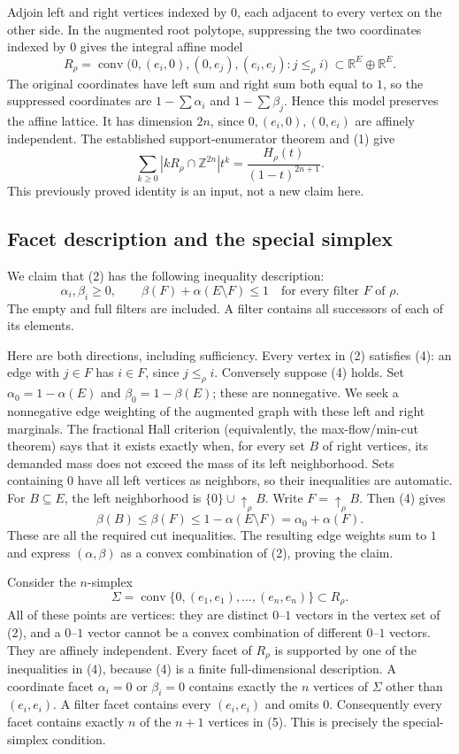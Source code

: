 \documentclass[11pt]{article}
\newcommand{\conv}{\operatorname{conv}}
\begin{document}
Adjoin left and right vertices indexed by $0$, each adjacent to every
vertex on the other side. In the augmented root polytope, suppressing
the two coordinates indexed by $0$ gives the integral affine model
\[
 R_\rho=\conv\bigl(0,(e_i,0),(0,e_j),(e_i,e_j):j\le_\rho i\bigr)
                  \ \subset\mathbb R^{E}\oplus\mathbb R^{E}.       \tag{2}
\]
The original coordinates have left sum and right sum both equal to
$1$, so the suppressed coordinates are $1-\sum\alpha_i$ and
$1-\sum\beta_j$. Hence this model preserves the affine lattice.
It has dimension $2n$, since $0,(e_i,0),(0,e_i)$ are affinely independent.
The established support-enumerator theorem \cite[Theorem 1.2]{D}
and (1) give
\[
 \sum_{k\ge0}|kR_\rho\cap\mathbb Z^{2n}|t^k
       =\frac{H_\rho(t)}{(1-t)^{2n+1}}.                             \tag{3}
\]
This previously proved identity is an input, not a new claim here.

\subsection*{Facet description and the special simplex}
We claim that (2) has the following inequality description:
\[
 \alpha_i,\beta_i\ge0,\qquad
 \beta(F)+\alpha(E\setminus F)\le1
                  \quad\text{for every filter $F$ of $\rho$}.       \tag{4}
\]
The empty and full filters are included. A filter contains all
successors of each of its elements.

Here are both directions, including sufficiency. Every vertex in (2)
satisfies (4): an edge with $j\in F$ has $i\in F$, since $j\le_\rho i$.
Conversely suppose (4) holds. Set
$\alpha_0=1-\alpha(E)$ and $\beta_0=1-\beta(E)$; these are nonnegative.
We seek a nonnegative edge weighting of the augmented graph with these
left and right marginals. The fractional Hall criterion (equivalently,
the max-flow/min-cut theorem) says that it exists exactly when, for
every set $B$ of right vertices, its demanded mass does not exceed the
mass of its left neighborhood. Sets containing $0$ have all left
vertices as neighbors, so their inequalities are automatic.
For $B\subseteq E$, the left neighborhood is
$\{0\}\cup\uparrow_\rho B$. Write $F=\uparrow_\rho B$. Then (4) gives
\[
 \beta(B)\le\beta(F)\le1-\alpha(E\setminus F)
                         =\alpha_0+\alpha(F).
\]
These are all the required cut inequalities. The resulting edge
weights sum to $1$ and express $(\alpha,\beta)$ as a convex combination
of (2), proving the claim.

Consider the $n$-simplex
\[
 \Sigma=\conv\{0,(e_1,e_1),\ldots,(e_n,e_n)\}\subset R_\rho.        \tag{5}
\]
All of these points are vertices: they are distinct $0$--$1$ vectors
in the vertex set of (2), and a $0$--$1$ vector cannot be a convex
combination of different $0$--$1$ vectors. They are affinely independent.
Every facet of $R_\rho$ is supported by one of the inequalities in (4),
because (4) is a finite full-dimensional description.
A coordinate facet $\alpha_i=0$ or $\beta_i=0$ contains exactly the
$n$ vertices of $\Sigma$ other than $(e_i,e_i)$.
A filter facet contains every $(e_i,e_i)$ and omits $0$.
Consequently every facet contains exactly $n$ of the $n+1$ vertices
in (5). This is precisely the special-simplex condition.
\end{document}
